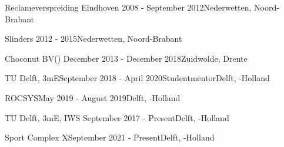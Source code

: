 \begin{rSection}{}
  \begin{experienceItem}
    {Reclameverspreiding Eindhoven}{ 2008 - September 2012}{}{Nederwetten, Noord-Brabant}
  \end{experienceItem}

  \begin{experienceItem}
    {Slinders}{ 2012 -  2015}{{}}{Nederwetten, Noord-Brabant}
  \end{experienceItem}

  \begin{experienceItem}
    {Choconut BV}{() December 2013 - December 2018}{}{Zuidwolde, Drente}
  \end{experienceItem}

  \begin{experienceItem}
    {TU Delft, 3mE}{September 2018 - April 2020}{Studentmentor}{Delft, -Holland}
  \end{experienceItem}

  \begin{experienceItem}
    {ROCSYS}{May 2019 - August 2019}{}{Delft, -Holland}
  \end{experienceItem}

  \begin{experienceItem}
    {TU Delft, 3mE, IWS }{September 2017 - Present}{}{Delft, -Holland}
  \end{experienceItem}

  \begin{experienceItem}
    {Sport Complex X}{September 2021 - Present}{}{Delft, -Holland}
  \end{experienceItem}

\end{rSection}


